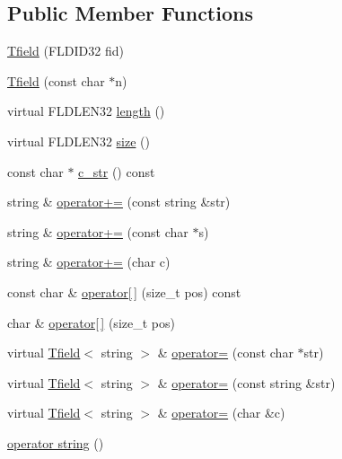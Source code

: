 \subsection*{Public Member Functions}
\begin{DoxyCompactItemize}
\item 
\hyperlink{classatmi_1_1_tfield_3_01std_1_1string_01_4_a46059c3e91ce3847b3109e4500f017f6}{Tfield} (F\+L\+D\+I\+D32 fid)
\item 
\hyperlink{classatmi_1_1_tfield_3_01std_1_1string_01_4_ac228a4c4d13e1573fd166a6506d98d87}{Tfield} (const char $\ast$n)
\item 
virtual F\+L\+D\+L\+E\+N32 \hyperlink{classatmi_1_1_tfield_3_01std_1_1string_01_4_ac4fdf6b5f9d1929b34bddc97274c6c9b}{length} ()
\item 
virtual F\+L\+D\+L\+E\+N32 \hyperlink{classatmi_1_1_tfield_3_01std_1_1string_01_4_aea88f61cd27f8f258ee473e0e938790b}{size} ()
\item 
const char $\ast$ \hyperlink{classatmi_1_1_tfield_3_01std_1_1string_01_4_a775ddd0103e3e3f0fc85dfda5df72280}{c\+\_\+str} () const 
\item 
string \& \hyperlink{classatmi_1_1_tfield_3_01std_1_1string_01_4_a95b55ca60414937f64af4705e7f8da08}{operator+=} (const string \&str)
\item 
string \& \hyperlink{classatmi_1_1_tfield_3_01std_1_1string_01_4_aa72122815bb188213438681fca0bb016}{operator+=} (const char $\ast$s)
\item 
string \& \hyperlink{classatmi_1_1_tfield_3_01std_1_1string_01_4_abf76ab2b474fc6b4500d3d9c57b0c083}{operator+=} (char c)
\item 
const char \& \hyperlink{classatmi_1_1_tfield_3_01std_1_1string_01_4_aeff4f32e684575375cff733f3838d8bc}{operator\mbox{[}$\,$\mbox{]}} (size\+\_\+t pos) const 
\item 
char \& \hyperlink{classatmi_1_1_tfield_3_01std_1_1string_01_4_a21a1c27750ed6b7d61695350e222454b}{operator\mbox{[}$\,$\mbox{]}} (size\+\_\+t pos)
\item 
virtual \hyperlink{classatmi_1_1_tfield}{Tfield}$<$ string $>$ \& \hyperlink{classatmi_1_1_tfield_3_01std_1_1string_01_4_a2d925169a3c28b5bcbcb62b0c3834f41}{operator=} (const char $\ast$str)
\item 
virtual \hyperlink{classatmi_1_1_tfield}{Tfield}$<$ string $>$ \& \hyperlink{classatmi_1_1_tfield_3_01std_1_1string_01_4_ad9da8df81976f159a95bd5729032fb42}{operator=} (const string \&str)
\item 
virtual \hyperlink{classatmi_1_1_tfield}{Tfield}$<$ string $>$ \& \hyperlink{classatmi_1_1_tfield_3_01std_1_1string_01_4_a9a1f850dc223743e8a498d25a93b3af9}{operator=} (char \&c)
\item 
\hyperlink{classatmi_1_1_tfield_3_01std_1_1string_01_4_a134b213194d5e1cda743d588e3c219e2}{operator string} ()
\end{DoxyCompactItemize}
